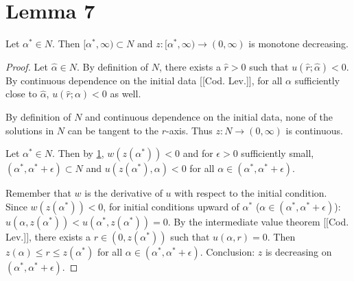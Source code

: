 \section{Lemma 7}
\begin{lemma}
Let $\alpha^*\in N$.
Then $[\alpha^*,\infty)\subset N\text{ and }z:[\alpha^*,\infty)\to(0,\infty)$ is monotone decreasing.
\begin{proof}


Let $\hat\alpha\in N$.
By definition of $N$, there exists a $\hat r>0$ such that $u(\hat r;\hat\alpha)<0$.
By continuous dependence on the initial data [[Cod. Lev.]],
for all $\alpha$ sufficiently close to $\hat\alpha$, $u(\hat r;\alpha)<0$ as well.

By definition of $N$ and continuous dependence on the initial data,
none of the solutions in $N$ can be tangent to the $r$-axis.
Thus $z:N\to(0,\infty)$ is continuous.


Let $\alpha^*\in N$.
Then by \ref{}, $w(z(\alpha^*))<0$ and for
$\epsilon>0$ sufficiently small,
$(\alpha^*,\alpha^*+\epsilon)\subset N$
and $u(z(\alpha^*),\alpha)<0$
for all $\alpha\in(\alpha^*,\alpha^*+\epsilon)$.

Remember that $w$ is the derivative of $u$ with respect to the initial condition.
Since $w(z(\alpha^*))<0$, for initial conditions upward of $\alpha^*$ ($\alpha\in(\alpha^*,\alpha^*+\epsilon)$):
$u(\alpha,z(\alpha^*))<u(\alpha^*,z(\alpha^*))=0$.
By the intermediate value theorem [[Cod. Lev.]], there exists a $r\in(0,z(\alpha^*))$ such that $u(\alpha,r)=0$.
Then $z(\alpha)\leq r\leq z(\alpha^*)$ for all $\alpha\in(\alpha^*,\alpha^*+\epsilon)$.
Conclusion: $z$ is decreasing on $(\alpha^*,\alpha^*+\epsilon)$.


\end{proof}
\end{lemma}
